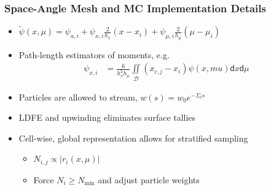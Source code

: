 \documentclass[xcolor=dvipsnames,handout]{beamer}
\newcommand{\colb}[1]{{\color{blue} #1}}
\newlength{\wideitemsep}
\let\olditem\item
\renewcommand{\item}{\setlength{\itemsep}{\wideitemsep}\olditem}
\renewcommand{\d}{\mathsf{d}}
\begin{document}
\begin{frame}
    \frametitle{Space-Angle Mesh and MC Implementation Details}
    \noindent
    \begin{minipage}[t]{0.36\linewidth}
        \centering
    \end{minipage}%
    \begin{minipage}[t]{0.70\linewidth}
        \vspace{-1.6in}
        \begin{itemize}
            \item {\small $\displaystyle \tilde \psi(x,\mu) = \psi_{a,i} + \psi_{x,i}
                \frac{2}{h_{x}}(x-x_i) + \psi_{\mu,i}
            \frac{2}{h_{\mu}}(\mu-\mu_i)$}
        \item Path-length estimators of moments, e.g.
            {\small
            \begin{align*}
                \psi_{x,i} &= \frac{6}{h_{x}^2h_\mu}
             \iint\limits_\mathcal{D} (x_{c,j}-x_i) \psi(x,mu) \d x \d \mu 
        \end{align*}}    
        \end{itemize}
    \end{minipage}
    \begin{itemize}
        \item Particles are allowed to stream, $w(s)=w_0 e^{-\Sigma_t s}$
        \item LDFE and upwinding \colb{eliminates} surface tallies
    \item Cell-wise, global representation allows for \colb{stratified} sampling
        \begin{itemize}
            \item $N_{i,j} \propto{|r_i(x,\mu)|}$
            \item Force $N_i \geq N_{\min}$ and adjust particle weights
        \end{itemize}

    \end{itemize}

\end{frame}
\end{document}

